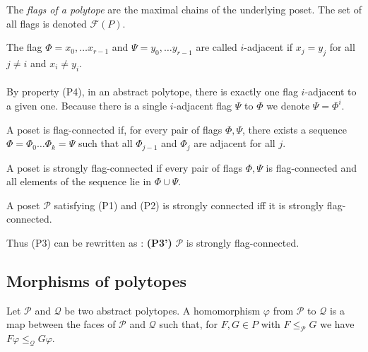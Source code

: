 \begin{definition}
  The \textit{flags of a polytope} are the maximal chains of the underlying poset. The set of all flags is denoted $\mathcal F(P)$.
\end{definition}

\begin{definition}
  The flag $\Phi = x_0, \dots x_{r-1}$ and $\Psi = y_0, \dots y_{r-1}$ are called $i$-adjacent if $x_j = y_j$ for all $j \neq i$ and $x_i \neq y_i$.
\end{definition}

\paragraph{}
By property (P4), in an abstract polytope, there is exactly one flag $i$-adjacent to a given one. Because there is a single $i$-adjacent flag $\Psi$ to $\Phi$ we denote $\Psi = \Phi^i$.

\begin{definition}
  A poset is flag-connected if, for every pair of flags $\Phi, \Psi$, there exists a sequence $\Phi = \Phi_0 \dots \Phi_k = \Psi$ such that all $\Phi_{j-1}$ and $\Phi_j$ are adjacent for all $j$.
\end{definition}

\begin{definition}
  A poset is strongly flag-connected if every pair of flags $\Phi, \Psi$ is flag-connected and all elements of the sequence lie in $\Phi \cup \Psi$.
\end{definition}

\begin{proposition}
  A poset $\mathcal P$ satisfying (P1) and (P2) is strongly connected iff it is strongly flag-connected.
\end{proposition}

Thus (P3) can be rewritten as : \textbf{(P3')} $\mathcal P$ is strongly flag-connected.

\subsection{Morphisms of polytopes}

\begin{definition}
  Let $\mathcal P$ and $\mathcal Q$ be two abstract polytopes. A homomorphism $\varphi$ from $\mathcal P$ to $\mathcal Q$ is a map between the faces of $\mathcal P$ and $\mathcal Q$ such that, for $F, G \in P$ with $F \le_{\mathcal P} G$ we have $F\varphi \le_{\mathcal Q} G\varphi$.
\end{definition}

